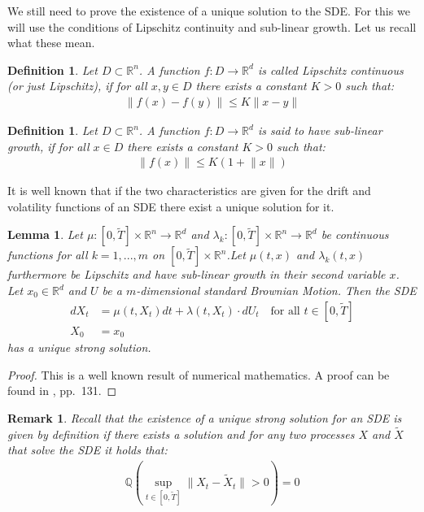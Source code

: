 \documentclass[12pt]{article}
\newtheorem{lemma}[theorem]{Lemma}
\newtheorem{remark}[theorem]{Remark}
\newtheorem{definition}[theorem]{Definition}
\begin{document}
	We still need to prove the existence of a unique solution to the SDE. For this we will use the conditions of Lipschitz continuity and sub-linear growth. Let us recall what these mean.
	\begin{definition}
		Let $D\subset \mathbb{R}^n$. A function $f: D \rightarrow \mathbb{R}^d$ is called Lipschitz continuous (or just Lipschitz), if for all $x, y\in D$ there exists a constant $K>0$ such that:
		\begin{align*}
			\lVert f(x) - f(y)\rVert \le K \lVert x - y\rVert
		\end{align*}
	\end{definition}
	\begin{definition}
		Let $D\subset \mathbb{R}^n$. A function $f: D \rightarrow \mathbb{R}^d$ is said to have \emph{sub-linear growth}, if for all $x\in D$ there exists a constant $K>0$ such that:
		\begin{align*}
			\lVert f(x)\rVert \le K\left(1 +  \lVert x\rVert\right)
		\end{align*}
	\end{definition}
	It is well known that if the two characteristics are given for the drift and volatility functions of an SDE there exist a unique solution for it.
	\begin{lemma}
		Let $\mu: \left[0,\tilde{T}\right]\times\mathbb{R}^n \rightarrow \mathbb{R}^d$ and $\lambda_k: \left[0,\tilde{T}\right]\times\mathbb{R}^n \rightarrow \mathbb{R}^d$ be continuous functions for all $k=1, ..., m$ on $\left[0,\tilde{T}\right]\times\mathbb{R}^n$.Let $\mu(t,x)$ and $\lambda_k(t,x)$ furthermore be Lipschitz and have sub-linear growth in their second variable $x$. Let $x_0\in \mathbb{R}^d$ and $U$ be a $m$-dimensional standard Brownian Motion. Then the SDE
		\begin{align*}
			dX_t &= \mu(t, X_t)dt + \lambda(t, X_t)\cdot dU_t \quad \text{for all } t \in \left[0, \tilde{T}\right]\\
			X_0&=x_0	
		\end{align*}
		has a unique strong solution.
	\end{lemma}
	\begin{proof}
		This is a well known result of numerical mathematics. A proof can be found in \cite{kloedenSchemes}, pp.\ 131.
	\end{proof}
	\begin{remark}
		Recall that the existence of a unique strong solution for an SDE is given by definition if there exists a solution and for any two processes $X$ and $\tilde{X}$ that solve the SDE it holds that:
		\begin{align*}
			\mathbb{Q}\left(\sup\limits_{t \in \left[0,\tilde{T}\right]}\lVert X_t - \tilde{X}_t\rVert  > 0\right) = 0
		\end{align*}
	\end{remark}
\end{document}
